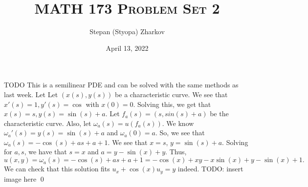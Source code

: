 \documentclass{article}
\title{\textsc{MATH 173 Problem Set 2}}
\author{Stepan (Styopa) Zharkov}
\date{April 13, 2022}
\begin{document}
\maketitle
{} TODO
\hop
\solution
This is a semilinear PDE and can be solved with the same methods as last week. Let 
Let $(x(s), y(s))$ be a characteristic curve. We see that $x'(s) = 1, y'(s) = \cos$ with $x(0) = 0$. 
\hop
Solving this, we get that $x(s) = s, y(s) = \sin(s) + a$. Let $f_a(s) = (s, 
sin(s)+a)$ be the characteristic curve. Also, let $\omega_a(s) = u(f_a(s))$.  We know $\omega_a'(s) = y(s) = \sin(s) + a$ and $\omega_a(0) = a$. So, we see that $\omega_a(s) = -\cos(s)+as +a +1$. We see that $x= s$, $y= \sin(s)+a$. Solving for $a, s$, we have that $s =x$ and $a = y - \sin(x) + y$. Thus,
\[u(x,y) = \omega_a(s)=-\cos(s)+as +a +1 = -\cos(x)+xy - x\sin(x)+y-\sin(x)+1.\]
We can check that this solution fits $u_x +\cos(x)u_y = y$ indeed. 
\hop
TODO: insert image here
\qed
\end{document}
